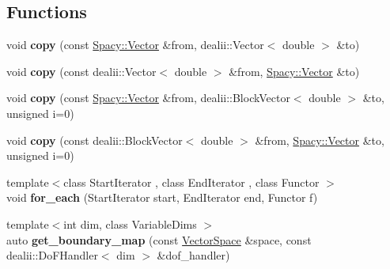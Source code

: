 \subsection*{Functions}
\begin{DoxyCompactItemize}
\item 
\hypertarget{namespaceSpacy_1_1dealII_a04fe7dee5a1cae496f7cea1bedf55436}{void {\bfseries copy} (const \hyperlink{classSpacy_1_1Vector}{Spacy\-::\-Vector} \&from, dealii\-::\-Vector$<$ double $>$ \&to)}\label{namespaceSpacy_1_1dealII_a04fe7dee5a1cae496f7cea1bedf55436}

\item 
\hypertarget{namespaceSpacy_1_1dealII_a06a29e6248e96f10f5f280a8d1ef2664}{void {\bfseries copy} (const dealii\-::\-Vector$<$ double $>$ \&from, \hyperlink{classSpacy_1_1Vector}{Spacy\-::\-Vector} \&to)}\label{namespaceSpacy_1_1dealII_a06a29e6248e96f10f5f280a8d1ef2664}

\item 
\hypertarget{namespaceSpacy_1_1dealII_a54dc2b5650da4d44ac0ec06ba2eefe13}{void {\bfseries copy} (const \hyperlink{classSpacy_1_1Vector}{Spacy\-::\-Vector} \&from, dealii\-::\-Block\-Vector$<$ double $>$ \&to, unsigned i=0)}\label{namespaceSpacy_1_1dealII_a54dc2b5650da4d44ac0ec06ba2eefe13}

\item 
\hypertarget{namespaceSpacy_1_1dealII_a6499e13e539f514fe25ea832955ee161}{void {\bfseries copy} (const dealii\-::\-Block\-Vector$<$ double $>$ \&from, \hyperlink{classSpacy_1_1Vector}{Spacy\-::\-Vector} \&to, unsigned i=0)}\label{namespaceSpacy_1_1dealII_a6499e13e539f514fe25ea832955ee161}

\item 
\hypertarget{namespaceSpacy_1_1dealII_acd641c7af30ce9e8dea35e2bb83d7ed0}{{\footnotesize template$<$class Start\-Iterator , class End\-Iterator , class Functor $>$ }\\void {\bfseries for\-\_\-each} (Start\-Iterator start, End\-Iterator end, Functor f)}\label{namespaceSpacy_1_1dealII_acd641c7af30ce9e8dea35e2bb83d7ed0}

\item 
\hypertarget{namespaceSpacy_1_1dealII_a2e99415b416185de7400ab54c162af8b}{{\footnotesize template$<$int dim, class Variable\-Dims $>$ }\\auto {\bfseries get\-\_\-boundary\-\_\-map} (const \hyperlink{classSpacy_1_1VectorSpace}{Vector\-Space} \&space, const dealii\-::\-Do\-F\-Handler$<$ dim $>$ \&dof\-\_\-handler)}\label{namespaceSpacy_1_1dealII_a2e99415b416185de7400ab54c162af8b}


\end{DoxyCompactItemize}
